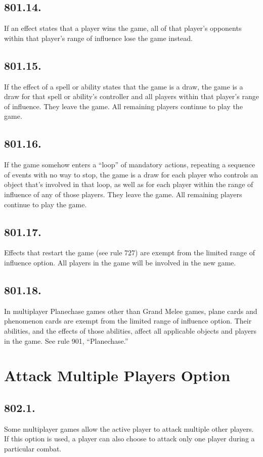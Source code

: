 \subsection*{801.14.}
If an effect states that a player wins the game, all of that player’s opponents within that player’s range of influence lose the game instead.

\subsection*{801.15.}
If the effect of a spell or ability states that the game is a draw, the game is a draw for that spell or ability’s controller and all players within that player’s range of influence. They leave the game. All remaining players continue to play the game.

\subsection*{801.16.}
If the game somehow enters a “loop” of mandatory actions, repeating a sequence of events with no way to stop, the game is a draw for each player who controls an object that’s involved in that loop, as well as for each player within the range of influence of any of those players. They leave the game. All remaining players continue to play the game.

\subsection*{801.17.}
Effects that restart the game (see rule 727) are exempt from the limited range of influence option. All players in the game will be involved in the new game.

\subsection*{801.18.}
In multiplayer Planechase games other than Grand Melee games, plane cards and phenomenon cards are exempt from the limited range of influence option. Their abilities, and the effects of those abilities, affect all applicable objects and players in the game. See rule 901, “Planechase.”

\section{Attack Multiple Players Option}
\subsection*{802.1.}
Some multiplayer games allow the active player to attack multiple other players. If this option is used, a player can also choose to attack only one player during a particular combat.


